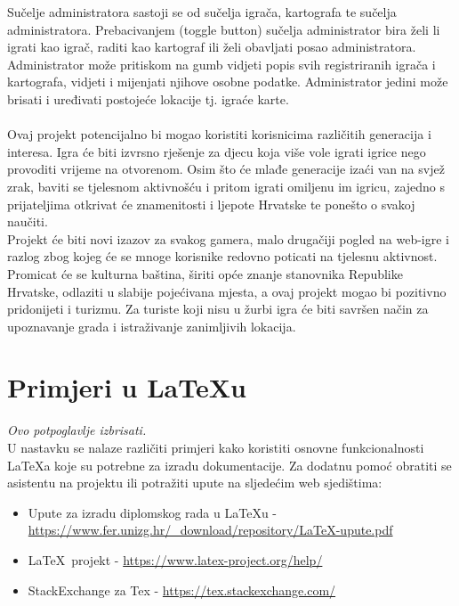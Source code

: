 		\textnormal{Sučelje administratora sastoji se od sučelja igrača, kartografa te sučelja administratora. Prebacivanjem (toggle button) sučelja administrator bira želi li igrati kao igrač, raditi kao kartograf ili želi obavljati posao administratora. Administrator može pritiskom na gumb vidjeti popis svih registriranih igrača i kartografa, vidjeti i mijenjati njihove osobne podatke. Administrator jedini može brisati i uređivati postojeće lokacije tj. igraće karte.}\\\\
	
		
		
		\textnormal{Ovaj projekt potencijalno bi mogao koristiti korisnicima različitih generacija i interesa. Igra će biti izvrsno rješenje za djecu koja više vole igrati igrice nego provoditi vrijeme na otvorenom. Osim što će mlađe generacije izaći van na svjež zrak, baviti se tjelesnom aktivnošću i pritom igrati omiljenu im igricu, zajedno s prijateljima otkrivat će znamenitosti i ljepote Hrvatske te ponešto o svakoj naučiti.}\\
		
		\textnormal{Projekt će biti novi izazov za svakog gamera, malo drugačiji pogled na web-igre i razlog zbog kojeg će se mnoge korisnike redovno poticati na tjelesnu aktivnost. Promicat će se kulturna baština, širiti opće znanje stanovnika Republike Hrvatske, odlaziti u slabije pojećivana mjesta, a ovaj projekt mogao bi pozitivno pridonijeti i turizmu. Za turiste koji nisu u žurbi igra će biti savršen način za upoznavanje grada i istraživanje zanimljivih lokacija.}\\
		
		\section{Primjeri u \LaTeX u}
		
		\textit{Ovo potpoglavlje izbrisati.}\\

		U nastavku se nalaze različiti primjeri kako koristiti osnovne funkcionalnosti \LaTeX a koje su potrebne za izradu dokumentacije. Za dodatnu pomoć obratiti se asistentu na projektu ili potražiti upute na sljedećim web sjedištima:
		\begin{itemize}
			\item Upute za izradu diplomskog rada u \LaTeX u - \url{https://www.fer.unizg.hr/_download/repository/LaTeX-upute.pdf}
			\item \LaTeX\ projekt - \url{https://www.latex-project.org/help/}
			\item StackExchange za Tex - \url{https://tex.stackexchange.com/}\\
		
		\end{itemize} 	


